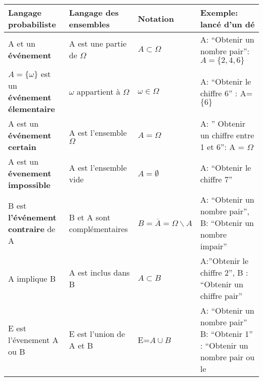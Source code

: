 \documentclass[a4paper]{report}
\theoremstyle{break}
\begin{document}
\begin{table}[h!]
  \small
\hspace{-2cm}
\renewcommand{\arraystretch}{2} %
\begin{tabular}{|L{5cm}|L{5cm}|L{1.5cm}|L{5cm}|}
  \hline
  Langage probabiliste & Langage des ensembles & Notation & Exemple: lancé d'un
                                                            dé \\
  \hline
  A et un \textbf{événement} & A est une partie de $\Omega$ & $A \subset \Omega$
                                                            & A: ``Obtenir un
                                                              nombre pair'':
                                                              $A=\{2,4,6\}$ \\
  \hline
  $ A=\{\omega\}$ est un \textbf{événement élementaire} & $\omega$ appartient à
                                                          $\Omega$
   &$\omega \in \Omega$ &  A: ``Obtenir le chiffre 6'' : A=$\{6\}$ \\
  \hline
  A est un \textbf{événement certain} & A est l'ensemble $\Omega$ & $A = \Omega$
                                                          & A: '' Obtenir un
                                                            chiffre entre 1 et
                                                            6'': A = $\Omega$\\
  \hline
  A est un \textbf{évenement impossible} & A est l'ensemble vide & $A = \emptyset$
                                                        & A: ``Obtenir le
                                                          chiffre 7'' \\
  \hline
  B est \textbf{l'événement contraire} de A & B et A sont complémentaires
                                            & $\scriptstyle{B = \overline{A} = \Omega
                                              \backslash A}$
                                            & A: ``Obtenir un nombre pair'', B: ``Obtenir
                                              un nombre impair'' \\
  \hline
  A implique B & A est inclus dans B & $A \subset B$ & A:''Obtenir le chiffre
                                                       2'', B : ``Obtenir un
                                                       chiffre pair'' \\
  \hline
  E est l'évenement A ou B & E est l'union de A et B & E=$A \cup B$ & A: ``Obtenir un nombre pair'' B: ``Obtenir 1''
                                    \color{red}{E}: ``Obtenir un nombre pair ou le

\end{tabular}
\end{table}
\end{document}
